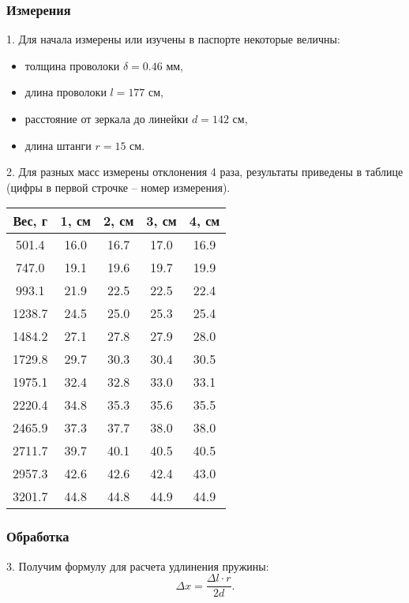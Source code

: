 \subsubsection{Измерения}
1. Для начала измерены или изучены в паспорте некоторые
величны:
\begin{itemize}
    \item толщина проволоки $\delta = 0.46$ мм,
    \item длина проволоки $l = 177$ см,
    \item расстояние от зеркала до линейки $d = 142$ см,
    \item длина штанги $r = 15$ см.
\end{itemize}

2. Для разных масс измерены отклонения 4 раза, результаты
приведены в таблице (цифры в первой строчке -- номер измерения).
\begin{center}

\begin{tabular*}{0.75\textwidth}{@{\extracolsep{\fill}}|c|c|c|c|c|}
    \hline
    Вес, г & 1, см & 2, см & 3, см & 4, см \\
    \hline
    501.4 & 16.0 & 16.7 & 17.0 & 16.9\\
    \hline
    747.0 & 19.1 & 19.6 & 19.7 & 19.9\\
    \hline
    993.1 & 21.9 & 22.5 & 22.5 & 22.4\\
    \hline
    1238.7 & 24.5 & 25.0 & 25.3 & 25.4\\
    \hline
    1484.2 & 27.1 & 27.8 & 27.9 & 28.0\\
    \hline
    1729.8 & 29.7 & 30.3 & 30.4 & 30.5\\
    \hline
    1975.1 & 32.4 & 32.8 & 33.0 & 33.1\\
    \hline
    2220.4 & 34.8 & 35.3 & 35.6 & 35.5\\
    \hline
    2465.9 & 37.3 & 37.7 & 38.0 & 38.0\\
    \hline
    2711.7 & 39.7 & 40.1 & 40.5 & 40.5\\
    \hline
    2957.3 & 42.6 & 42.6 & 42.4 & 43.0\\
    \hline
    3201.7 & 44.8 & 44.8 & 44.9 & 44.9\\
    \hline

\end{tabular*}

\end{center}

\subsubsection{Обработка}
3. Получим формулу для расчета удлинения пружины:
\begin{equation}
    \Delta x = \frac{\Delta l\cdot r}{2d}.
\end{equation}

